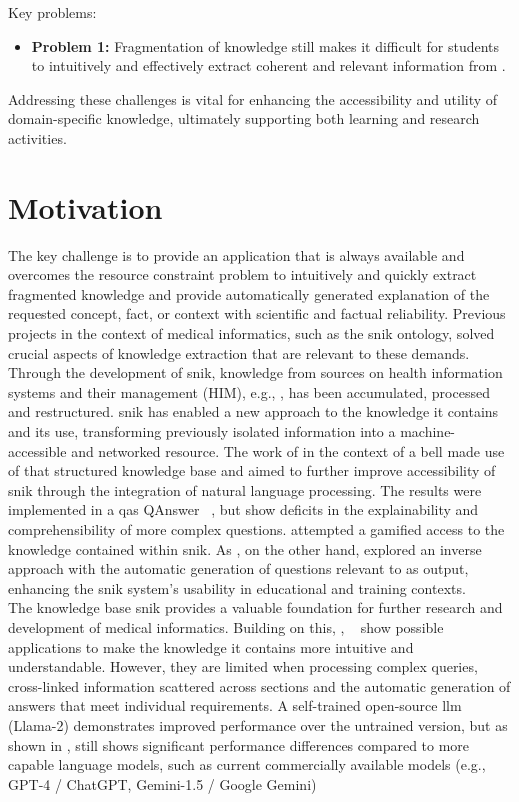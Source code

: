 Key problems:
\begin{itemize}
  \item \textbf{Problem 1:} Fragmentation of knowledge still makes it difficult for students to intuitively and effectively extract coherent and relevant information from \citet{bb2}.
\end{itemize}
%
Addressing these challenges is vital for enhancing the accessibility and utility of domain-specific knowledge, ultimately supporting both learning and research activities. 
%
\section{Motivation}\label{sec:motivation}

The key challenge is to provide an application that is always available and overcomes the resource constraint problem to intuitively and quickly extract fragmented knowledge and provide automatically generated explanation of the requested concept, fact, or context with scientific and factual reliability.
%
Previous projects in the context of medical informatics, such as the \ac{snik} ontology, solved crucial aspects of knowledge extraction that are relevant to these demands.
Through the development of \ac{snik}, knowledge from sources on health information systems and their management (HIM), e.g., \citet{bb2}, has been accumulated, processed and restructured.    
\ac{snik} has enabled a new approach to the knowledge it contains and its use, transforming previously isolated information into a machine-accessible and networked resource.
The work of \citet{hannesbell, hannesbell_skill} in the context of a \ac{bell} made use of that structured knowledge base and aimed to further improve accessibility of \ac{snik} through the integration of natural language processing. 
The results were implemented in a \ac{qas} QAnswer ~\citep{qanswer}, but show deficits in the explainability and comprehensibility of more complex questions. 
\citet{snikquiz} attempted a gamified access to the knowledge contained within \ac{snik}. 
As \citet{arneba}, on the other hand, explored an inverse approach with the automatic generation of questions relevant to \citep{snikquiz} as output, enhancing the \ac{snik} system's usability in educational and training contexts.\\
The knowledge base \ac{snik} provides a valuable foundation for further research and development of medical informatics.
Building on this, \citet{hannesbell, hannesbell_skill}, ~\citep{qanswer} show possible applications to make the knowledge it contains more intuitive and understandable.
However, they are limited when processing complex queries, cross-linked information scattered across sections and the automatic generation of answers that meet individual requirements.
%
A self-trained open-source \ac{llm} (Llama-2) demonstrates improved performance over the untrained version, but as shown in \citet{Paul_Keller}, still shows significant performance differences compared to more capable language models, such as current commercially available models (e.g., GPT-4 / ChatGPT, Gemini-1.5 / Google Gemini)

